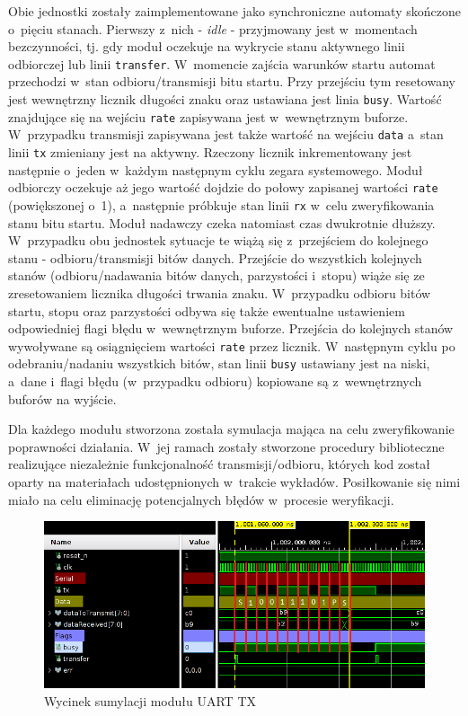 Obie jednostki zostały zaimplementowane jako synchroniczne automaty skończone o~pięciu stanach. Pierwszy z~nich - \textit{idle} - przyjmowany jest w~momentach bezczynności, tj. gdy moduł oczekuje na wykrycie stanu aktywnego linii odbiorczej lub linii \verb|transfer|. W~momencie zajścia warunków startu automat przechodzi w~stan odbioru/transmisji bitu startu. Przy przejściu tym resetowany jest wewnętrzny licznik długości znaku oraz ustawiana jest linia \verb|busy|. Wartość znajdujące się na wejściu \verb|rate| zapisywana jest w~wewnętrznym buforze. W~przypadku transmisji zapisywana jest także wartość na wejściu \verb|data| a~stan linii \verb|tx| zmieniany jest na aktywny. Rzeczony licznik inkrementowany jest następnie o~jeden w~każdym następnym cyklu zegara systemowego. Moduł odbiorczy oczekuje aż jego wartość dojdzie do połowy zapisanej wartości \verb|rate| (powiększonej o~1), a~następnie próbkuje stan linii \verb|rx| w~celu zweryfikowania stanu bitu startu. Moduł nadawczy czeka natomiast czas dwukrotnie dłuższy. W~przypadku obu jednostek sytuacje te wiążą się z~przejściem do kolejnego stanu - odbioru/transmisji bitów danych. Przejście do wszystkich kolejnych stanów (odbioru/nadawania bitów danych, parzystości i~stopu) wiąże się ze zresetowaniem licznika długości trwania znaku. W~przypadku odbioru bitów startu, stopu oraz parzystości odbywa się także ewentualne ustawieniem odpowiedniej flagi błędu w~wewnętrznym buforze. Przejścia do kolejnych stanów wywoływane są osiągnięciem wartości \verb|rate| przez licznik. W~następnym cyklu po odebraniu/nadaniu wszystkich bitów, stan linii \verb|busy| ustawiany jest na niski, a~dane i~flagi błędu (w~przypadku odbioru) kopiowane są z~wewnętrznych buforów na wyjście.

Dla każdego modułu stworzona została symulacja mająca na celu zweryfikowanie poprawności działania. W~jej ramach zostały stworzone procedury biblioteczne realizujące niezależnie funkcjonalność transmisji/odbioru, których kod został oparty na materiałach udostępnionych w~trakcie wykładów. Posiłkowanie się nimi miało na celu eliminację potencjalnych błędów w~procesie weryfikacji.

\vspace{0.5cm}
\begin{figure}[ht]
    \centering
    \includegraphics[scale=0.7]{img/sim/communication/uart_tx_sim.png}
    \captionsetup{format=plain,justification=centering}
    \caption{Wycinek sumylacji modułu UART TX}
    \label{sim-uart-tx}
\end{figure}
\vspace{0.5cm}

